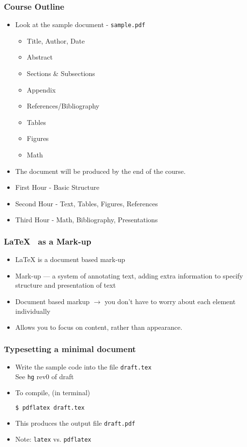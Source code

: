 \documentclass{beamer}
\newcommand{\typ}[1]{\lstinline{#1}}
\begin{document}
\begin{frame}
  \frametitle{Course Outline}
  \begin{itemize}
  \item Look at the sample document - \typ{sample.pdf}
    \begin{itemize}
    \item Title, Author, Date
    \item Abstract
    \item Sections \& Subsections
    \item Appendix
    \item References/Bibliography
    \item Tables
    \item Figures
    \item Math
    \end{itemize}
  \item The document will be produced by the end of the course. 
  \item First Hour - Basic Structure
  \item Second Hour - Text, Tables, Figures, References
  \item Third Hour - Math, Bibliography, Presentations
  \end{itemize}
\end{frame}

\begin{frame}[fragile]
  \frametitle{\LaTeX~ as a Mark-up}
  \begin{itemize}
  \item {\LaTeX} is a document based mark-up
  \item Mark-up --- a system of annotating text, adding extra
    information to specify structure and presentation of text
  \item Document based markup $\rightarrow$ you don't have to worry
    about each element individually 
  \item Allows you to focus on content, rather than appearance.
  \end{itemize}
\end{frame}

\begin{frame}[fragile]
  \frametitle{Typesetting a minimal document}
  \begin{itemize}
  \item Write the sample code  into the file \typ{draft.tex}\\
      {\tiny See \typ{hg} rev0 of draft}
  \item   To compile, (in terminal) \\
    \begin{lstlisting}[language=bash]
      $ pdflatex draft.tex
    \end{lstlisting} %
  \item This produces the output file \typ{draft.pdf} 
  \item \alert{Note:} \typ{latex} vs. \typ{pdflatex} 
  \end{itemize}
\end{frame}  
\end{document}
